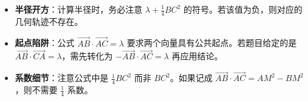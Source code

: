 \begin{trapbox}
\begin{itemize}
    \item \textbf{半径开方}：计算半径时，务必注意 $\lambda + \frac{1}{4}BC^2$ 的符号。若该值为负，则对应的几何轨迹不存在。
    \item \textbf{起点陷阱}：公式 $\vec{AB} \cdot \vec{AC} = \lambda$ 要求两个向量具有公共起点。若题目给定的是 $\vec{AB} \cdot \vec{CA} = \lambda$，需先转化为 $-\vec{AB} \cdot \vec{AC} = \lambda$ 再应用结论。
    \item \textbf{系数细节}：注意公式中是 $\frac{1}{4}BC^2$ 而非 $BC^2$。如果记成 $\vec{AB} \cdot \vec{AC} = AM^2 - BM^2$，则不需要 $\frac{1}{4}$ 系数。
\end{itemize}
\end{trapbox}